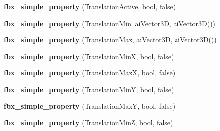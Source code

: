 \begin{DoxyCompactItemize}
\item 
\hypertarget{class_assimp_1_1_f_b_x_1_1_model_aafb1cea3588fcfac65efb44df7262148}{{\bfseries fbx\+\_\+simple\+\_\+property} (Translation\+Active, bool, false)}\label{class_assimp_1_1_f_b_x_1_1_model_aafb1cea3588fcfac65efb44df7262148}

\item 
\hypertarget{class_assimp_1_1_f_b_x_1_1_model_ab4d5d5b081f5edcafde1cde84d048480}{{\bfseries fbx\+\_\+simple\+\_\+property} (Translation\+Min, \hyperlink{structai_vector3_d}{ai\+Vector3\+D}, \hyperlink{structai_vector3_d}{ai\+Vector3\+D}())}\label{class_assimp_1_1_f_b_x_1_1_model_ab4d5d5b081f5edcafde1cde84d048480}

\item 
\hypertarget{class_assimp_1_1_f_b_x_1_1_model_acfe8ee3d647366d980c698172df0ac29}{{\bfseries fbx\+\_\+simple\+\_\+property} (Translation\+Max, \hyperlink{structai_vector3_d}{ai\+Vector3\+D}, \hyperlink{structai_vector3_d}{ai\+Vector3\+D}())}\label{class_assimp_1_1_f_b_x_1_1_model_acfe8ee3d647366d980c698172df0ac29}

\item 
\hypertarget{class_assimp_1_1_f_b_x_1_1_model_ad23b719fbbcbffa5ff11fc499ca0925b}{{\bfseries fbx\+\_\+simple\+\_\+property} (Translation\+Min\+X, bool, false)}\label{class_assimp_1_1_f_b_x_1_1_model_ad23b719fbbcbffa5ff11fc499ca0925b}

\item 
\hypertarget{class_assimp_1_1_f_b_x_1_1_model_a76012aba5074abb02e5f18c068b6405c}{{\bfseries fbx\+\_\+simple\+\_\+property} (Translation\+Max\+X, bool, false)}\label{class_assimp_1_1_f_b_x_1_1_model_a76012aba5074abb02e5f18c068b6405c}

\item 
\hypertarget{class_assimp_1_1_f_b_x_1_1_model_aab64fb63d09b73029419e8a894b9dfa8}{{\bfseries fbx\+\_\+simple\+\_\+property} (Translation\+Min\+Y, bool, false)}\label{class_assimp_1_1_f_b_x_1_1_model_aab64fb63d09b73029419e8a894b9dfa8}

\item 
\hypertarget{class_assimp_1_1_f_b_x_1_1_model_aed5da3172de7fabcafab6b4b69f4ec40}{{\bfseries fbx\+\_\+simple\+\_\+property} (Translation\+Max\+Y, bool, false)}\label{class_assimp_1_1_f_b_x_1_1_model_aed5da3172de7fabcafab6b4b69f4ec40}

\item 
\hypertarget{class_assimp_1_1_f_b_x_1_1_model_a61d0b8368d77e2dbc06ab431c45cd334}{{\bfseries fbx\+\_\+simple\+\_\+property} (Translation\+Min\+Z, bool, false)}\label{class_assimp_1_1_f_b_x_1_1_model_a61d0b8368d77e2dbc06ab431c45cd334}


\end{DoxyCompactItemize}
